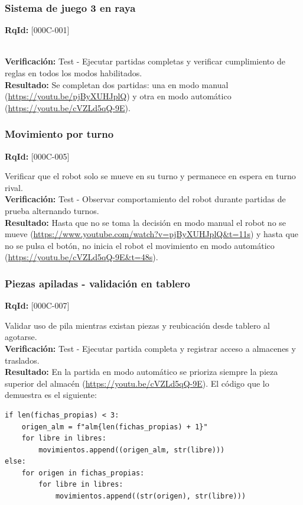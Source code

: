 \documentclass[12pt,a4paper]{article}
\begin{document}
\subsubsection{Sistema de juego 3 en raya}
\textbf{RqId:} [000C-001]
\vspace{0.3em}
\par [Descripción del sistema de juego 3 en raya]
\\ \textbf{Verificación:} Test - Ejecutar partidas completas y verificar cumplimiento de reglas en todos los modos habilitados.
\\ \textbf{Resultado:} Se completan dos partidas: una en modo manual (\url{https://youtu.be/pjByXUHJplQ}) y otra en modo automático (\url{https://youtu.be/cVZLd5qQ-9E}).


\subsubsection{Movimiento por turno}
\textbf{RqId:} [000C-005]
\vspace{0.3em}
\par Verificar que el robot solo se mueve en su turno y permanece en espera en turno rival.
\\ \textbf{Verificación:} Test - Observar comportamiento del robot durante partidas de prueba alternando turnos.
\\ \textbf{Resultado:} Hasta que no se toma la decisión en modo manual el robot no se mueve (\url{https://www.youtube.com/watch?v=pjByXUHJplQ&t=11s}) y hasta que no se pulsa el botón, no inicia el robot el movimiento en modo automático (\url{https://youtu.be/cVZLd5qQ-9E&t=48s}).
\subsubsection{Piezas apiladas - validación en tablero}
\textbf{RqId:} [000C-007]
\vspace{0.3em}
\par Validar uso de pila mientras existan piezas y reubicación desde tablero al agotarse.
\\ \textbf{Verificación:} Test - Ejecutar partida completa y registrar acceso a almacenes y traslados.
\\ \textbf{Resultado:} En la partida en modo automático se prioriza siempre la pieza superior del almacén (\url{https://youtu.be/cVZLd5qQ-9E}). El código que lo demuestra es el siguiente:
\begin{lstlisting}[style=pythoncode, caption={Generación de movimientos priorizando piezas del almacén.}]
if len(fichas_propias) < 3:
    origen_alm = f"alm{len(fichas_propias) + 1}"
    for libre in libres:
        movimientos.append((origen_alm, str(libre)))
else:
    for origen in fichas_propias:
        for libre in libres:
            movimientos.append((str(origen), str(libre)))
\end{lstlisting}
\end{document}
